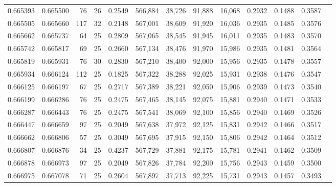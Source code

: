 \begin{tabular}{rrrrrrrrrrrrr}
0.665393 & 0.665500 &  76 &  26 &                                     0.2549 & 566,884 &  38,726 &  91,888 &  16,068 & 0.2932 & 0.1488 & 0.3587 \\
0.665505 & 0.665660 & 117 &  32 &                                     0.2148 & 567,001 &  38,609 &  91,920 &  16,036 & 0.2935 & 0.1485 & 0.3576 \\
0.665662 & 0.665737 &  64 &  25 &                                     0.2809 & 567,065 &  38,545 &  91,945 &  16,011 & 0.2935 & 0.1483 & 0.3570 \\
0.665742 & 0.665817 &  69 &  25 &                                     0.2660 & 567,134 &  38,476 &  91,970 &  15,986 & 0.2935 & 0.1481 & 0.3564 \\
0.665819 & 0.665931 &  76 &  30 &                                     0.2830 & 567,210 &  38,400 &  92,000 &  15,956 & 0.2935 & 0.1478 & 0.3557 \\
0.665934 & 0.666124 & 112 &  25 &                                     0.1825 & 567,322 &  38,288 &  92,025 &  15,931 & 0.2938 & 0.1476 & 0.3547 \\
0.666125 & 0.666197 &  67 &  25 &                                     0.2717 & 567,389 &  38,221 &  92,050 &  15,906 & 0.2939 & 0.1473 & 0.3540 \\
0.666199 & 0.666286 &  76 &  25 &                                     0.2475 & 567,465 &  38,145 &  92,075 &  15,881 & 0.2940 & 0.1471 & 0.3533 \\
0.666287 & 0.666443 &  76 &  25 &                                     0.2475 & 567,541 &  38,069 &  92,100 &  15,856 & 0.2940 & 0.1469 & 0.3526 \\
0.666447 & 0.666659 &  97 &  25 &                                     0.2049 & 567,638 &  37,972 &  92,125 &  15,831 & 0.2942 & 0.1466 & 0.3517 \\
0.666662 & 0.666806 &  57 &  25 &                                     0.3049 & 567,695 &  37,915 &  92,150 &  15,806 & 0.2942 & 0.1464 & 0.3512 \\
0.666807 & 0.666876 &  34 &  25 &                                     0.4237 & 567,729 &  37,881 &  92,175 &  15,781 & 0.2941 & 0.1462 & 0.3509 \\
0.666878 & 0.666973 &  97 &  25 &                                     0.2049 & 567,826 &  37,784 &  92,200 &  15,756 & 0.2943 & 0.1459 & 0.3500 \\
0.666975 & 0.667078 &  71 &  25 &                                     0.2604 & 567,897 &  37,713 &  92,225 &  15,731 & 0.2943 & 0.1457 & 0.3493 \\

\end{tabular}
